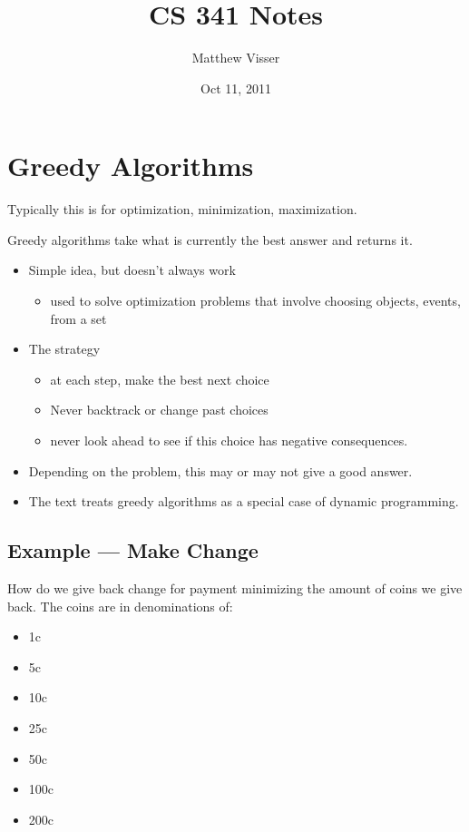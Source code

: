\documentclass[12pt]{article}
\begin{document}
\title{CS 341 Notes}
\author{Matthew Visser}
\date{Oct 11, 2011}
\maketitle

\section{Greedy Algorithms}

Typically this is for optimization, minimization, maximization.

Greedy algorithms take what is currently the best answer and returns it.

\begin{itemize}
	\item Simple idea, but doesn't always work
		\begin{itemize}
			\item used to solve optimization problems that involve choosing
				objects, events, from a set
		\end{itemize}
	\item The strategy
		\begin{itemize}
			\item at each step, make the best next choice
			\item Never backtrack or change past choices
			\item never look ahead to see if this choice has negative
				consequences.
		\end{itemize}
	\item Depending on the problem, this may or may not give a good answer.
	\item The text treats greedy algorithms as a special case of dynamic
		programming.
\end{itemize}

\subsection{Example --- Make Change}

How do we give back change for payment minimizing the amount of coins we give
back. The coins are in denominations of:
\begin{itemize}
	\item 1c
	\item 5c
	\item 10c
	\item 25c
	\item 50c
	\item 100c
	\item 200c
\end{itemize}
\end{document}
